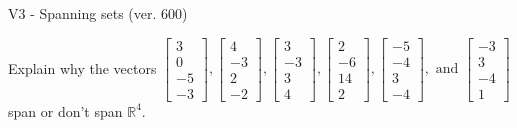 \begin{exercise}
  \begin{exerciseTitle}V3 - Spanning sets (ver. 600)\end{exerciseTitle}
  \begin{exerciseStatement}
    Explain why the vectors \(\left[\begin{array}{r}
3 \\
0 \\
-5 \\
-3
\end{array}\right] , \left[\begin{array}{r}
4 \\
-3 \\
2 \\
-2
\end{array}\right] , \left[\begin{array}{r}
3 \\
-3 \\
3 \\
4
\end{array}\right] , \left[\begin{array}{r}
2 \\
-6 \\
14 \\
2
\end{array}\right] , \left[\begin{array}{r}
-5 \\
-4 \\
3 \\
-4
\end{array}\right] , \text{ and } \left[\begin{array}{r}
-3 \\
3 \\
-4 \\
1
\end{array}\right]\) span or don't span \(\mathbb{R}^4\). 
	



\end{exerciseStatement}
\end{exercise}
